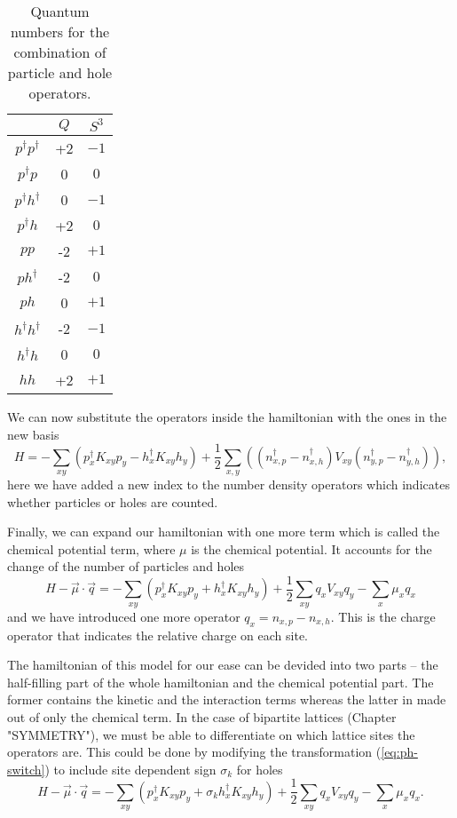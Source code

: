 \begin{table}[h]
    \centering
    \begin{tabular}{c|cc}
        & $Q$ & $S^3$ \\
    \hline
        $p^\dagger p^\dagger$ & +2 & $-1$ \\
        $p^\dagger p$ & 0 & $0$ \\
        $p^\dagger h^\dagger$ & 0 & $-1$ \\
        $p^\dagger h$ & +2 & $0$ \\
        $p p$ & -2 & $+1$ \\
        $p h^\dagger$ & -2 & $0$ \\
        $p h$ & 0 & $+1$ \\
        $h^\dagger h^\dagger$ & -2 & $-1$ \\
        $h^\dagger h$ & 0 & $0$ \\
        $h h$ & +2 & $+1$ \\
    \end{tabular}
    \caption{Quantum numbers for the combination of particle and hole operators.}
    \label{tab:ph-comb}
\end{table}

We can now substitute the operators inside the hamiltonian with the ones in the new basis
\begin{equation}
    H = - \sum_{xy} \left( p^\dagger_x K_{xy} p_y - h^\dagger_x K_{xy} h_y \right) + \frac{1}{2} \sum_{x,y} \left( (n^\dagger_{x,p} - n^\dagger_{x,h}) V_{xy} (n^\dagger_{y,p} - n^\dagger_{y,h}) \right),
\end{equation}
here we have added a new index to the number density operators which indicates whether particles or holes are counted.

Finally, we can expand our hamiltonian with one more term which is called the chemical potential term, where $\mu$ is the chemical potential. It accounts for the change of the number of particles and holes
\begin{equation}
    H - \vec{\mu}\cdot\vec{q} = - \sum_{xy} \left( p^\dagger_x K_{xy} p_y + h^\dagger_x K_{xy} h_y \right) + \frac{1}{2}\sum_{xy} q_x V_{xy} q_y - \sum_{x} \mu_x q_x
\end{equation}
and we have introduced one more operator $q_x = n_{x,p} - n_{x,h}$. This is the charge operator that indicates the relative charge on each site. 

The hamiltonian of this model for our ease can be devided into two parts -- the half-filling part of the whole hamiltonian and the chemical potential part. The former contains the kinetic and the interaction terms whereas the latter in made out of only the chemical term. In the case of bipartite lattices (Chapter "SYMMETRY"), we must be able to differentiate on which lattice sites the operators are. This could be done by modifying the transformation (\ref{eq:ph-switch}) to include site dependent sign $\sigma_k$ for holes
\begin{equation}
    H - \vec{\mu}\cdot\vec{q} = - \sum_{xy} \left( p^\dagger_x K_{xy} p_y + \sigma_k h^\dagger_x K_{xy} h_y \right) + \frac{1}{2}\sum_{xy} q_x V_{xy} q_y - \sum_{x} \mu_x q_x.
\end{equation}

